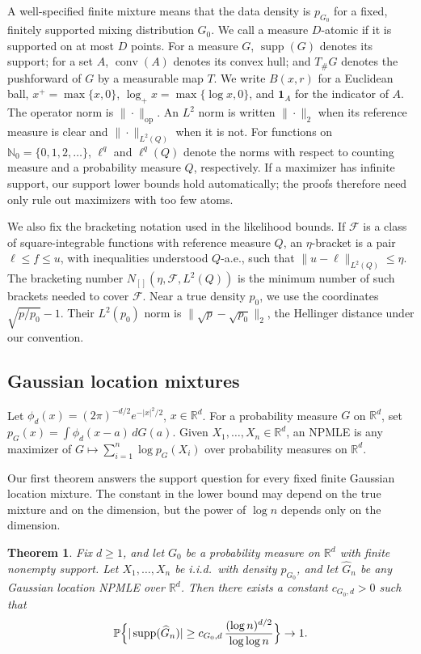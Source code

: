 \documentclass[11pt]{article}
\newtheorem{theorem}{Theorem}[section]
\theoremstyle{definition}
\numberwithin{equation}{section}
\newcommand{\R}{\mathbb{R}}
\newcommand{\wh}{\widehat}
\newcommand{\op}{\mathrm{op}}
\DeclareMathOperator{\supp}{supp}
\DeclareMathOperator{\conv}{conv}
\begin{document}
A well-specified finite mixture means that the data density is $p_{G_0}$
for a fixed, finitely supported mixing distribution $G_0$. We call a measure
$D$-atomic if it is supported on at most $D$ points. For a measure $G$,
$\supp(G)$ denotes its support; for a set $A$, $\conv(A)$ denotes its convex
hull; and $T_\#G$ denotes the pushforward of $G$ by a measurable map $T$.
We write $B(x,r)$ for a Euclidean ball, $x^+=\max\{x,0\}$,
$\log_+x=\max\{\log x,0\}$, and $\mathbf 1_A$ for the indicator of $A$.
The operator norm is $\|\cdot\|_{\op}$. An $L^2$ norm is written
$\|\cdot\|_2$ when its reference measure is clear and $\|\cdot\|_{L^2(Q)}$
when it is not. For functions on $\mathbb N_0=\{0,1,2,\ldots\}$,
$\ell^q$ and $\ell^q(Q)$ denote the norms with respect to counting measure
and a probability measure $Q$, respectively. If a maximizer has infinite
support, our support lower bounds hold automatically; the proofs therefore
need only rule out maximizers with too few atoms.

We also fix the bracketing notation used in the likelihood bounds. If
\(\mathcal F\) is a class of square-integrable functions with reference
measure \(Q\), an \(\eta\)-bracket is a pair \(\ell\le f\le u\), with
inequalities understood \(Q\)-a.e., such that
\(\|u-\ell\|_{L^2(Q)}\le\eta\). The bracketing number
\(N_{[]}(\eta,\mathcal F,L^2(Q))\) is the minimum number of such brackets
needed to cover \(\mathcal F\). Near a true density \(p_0\), we use the
coordinates \(\sqrt{p/p_0}-1\). Their \(L^2(p_0)\) norm is
\(\|\sqrt p-\sqrt{p_0}\|_2\), the Hellinger distance under our convention.

\subsection*{Gaussian location mixtures}

Let $\phi_d(x)=(2\pi)^{-d/2}e^{-|x|^2/2}$, $x\in\R^d$. For a probability measure $G$ on $\R^d$, set $p_G(x)=\int \phi_d(x-a)\,dG(a)$. Given $X_1,\dots,X_n\in\R^d$, an NPMLE is any maximizer of $G\mapsto \sum_{i=1}^n \log p_G(X_i)$ over probability measures on $\R^d$.

Our first theorem answers the support question for every fixed finite Gaussian
location mixture. The constant in the lower bound may depend on the true
mixture and on the dimension, but the power of \(\log n\) depends only on the
dimension.

\begin{theorem}
\label{thm:gaussian-finite-main}
Fix $d\ge1$, and let $G_0$ be a probability measure on $\R^d$ with finite nonempty support. Let $X_1,\dots,X_n$ be i.i.d.\ with density $p_{G_0}$, and let $\wh G_n$ be any Gaussian location NPMLE over $\R^d$. Then there exists a constant $c_{G_0,d}>0$ such that
\[
    \mathbb P\Bigl\{
        |\supp(\wh G_n)|
        \ge
        c_{G_0,d}\,
        \frac{(\log n)^{d/2}}{\log\log n}
    \Bigr\}\to1.
\]
\end{theorem}
\end{document}
